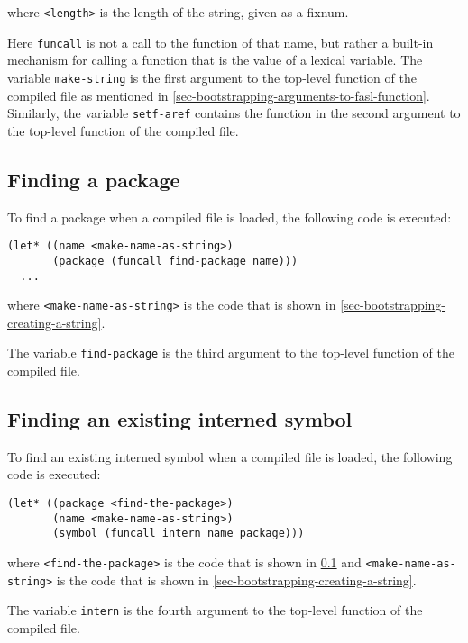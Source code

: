 where \texttt{<length>} is the length of the string, given as a
fixnum.

Here \texttt{funcall} is not a call to the \commonlisp{} function of
that name, but rather a built-in mechanism for calling a function that
is the value of a lexical variable.  The variable \texttt{make-string}
is the first argument to the top-level function of the compiled file
as mentioned in \ref{sec-bootstrapping-arguments-to-fasl-function}.
Similarly, the variable \texttt{setf-aref} contains the function in
the second argument to the top-level function of the compiled file.

\subsection{Finding a package}
\label{sec-bootstrapping-finding-a-package}

To find a package when a compiled file is loaded, the following code
is executed:

\begin{verbatim}
(let* ((name <make-name-as-string>)
       (package (funcall find-package name)))
  ...
\end{verbatim}

where \texttt{<make-name-as-string>} is the code that is shown in
\ref{sec-bootstrapping-creating-a-string}.

The variable \texttt{find-package} is the third argument to the
top-level function of the compiled file.

\subsection{Finding an existing interned symbol}
\label{sec-bootstrapping-finding-an-existing-interned-symbol}

To find an existing interned symbol when a compiled file is loaded,
the following code is executed:

\begin{verbatim}
(let* ((package <find-the-package>)
       (name <make-name-as-string>)
       (symbol (funcall intern name package)))
\end{verbatim}

where \texttt{<find-the-package>} is the code that is shown in
\ref{sec-bootstrapping-finding-a-package} and
\texttt{<make-name-as-string>} is the code that is shown in
\ref{sec-bootstrapping-creating-a-string}.

The variable \texttt{intern} is the fourth argument to the
top-level function of the compiled file.

